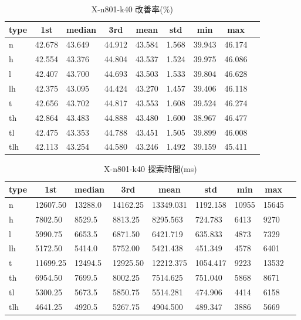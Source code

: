 \begin{table}[htbp]
    \centering
    \caption{X-n801-k40 改善率(\%)}
    \begin{tabular}{|l|l|l|l|l|l|l|l|l|}\hline
    \multicolumn{1}{|c|}{\textbf{type}}
    &\multicolumn{1}{|c|}{\textbf{1st}}
    &\multicolumn{1}{c|}{\textbf{median}}
    &\multicolumn{1}{c|}{\textbf{3rd}}
    &\multicolumn{1}{c|}{\textbf{mean}}
    &\multicolumn{1}{c|}{\textbf{std}}
    &\multicolumn{1}{c|}{\textbf{min}}
    &\multicolumn{1}{c|}{\textbf{max}}\\\hline
	n & 42.678 & 43.649 & 44.912 & 43.584 & 1.568 & 39.943 & 46.174\\\hline
	h & 42.554 & 43.376 & 44.804 & 43.537 & 1.524 & 39.975 & 46.086\\\hline
	l & 42.407 & 43.700 & 44.693 & 43.503 & 1.533 & 39.804 & 46.628\\\hline
	lh & 42.375 & 43.095 & 44.424 & 43.270 & 1.457 & 39.406 & 46.118\\\hline
	t & 42.656 & 43.702 & 44.817 & 43.553 & 1.608 & 39.524 & 46.274\\\hline
	th & 42.864 & 43.483 & 44.888 & 43.480 & 1.600 & 38.967 & 46.477\\\hline
	tl & 42.475 & 43.353 & 44.788 & 43.451 & 1.505 & 39.899 & 46.008\\\hline
	tlh & 42.113 & 43.254 & 44.580 & 43.246 & 1.492 & 39.159 & 45.411\\\hline
	\end{tabular}
\end{table}
\begin{table}[htbp]
    \centering
    \caption{X-n801-k40 探索時間(ms)}
    \begin{tabular}{|l|l|l|l|l|l|l|l|l|}\hline
    \multicolumn{1}{|c|}{\textbf{type}}
    &\multicolumn{1}{|c|}{\textbf{1st}}
    &\multicolumn{1}{c|}{\textbf{median}}
    &\multicolumn{1}{c|}{\textbf{3rd}}
    &\multicolumn{1}{c|}{\textbf{mean}}
    &\multicolumn{1}{c|}{\textbf{std}}
    &\multicolumn{1}{c|}{\textbf{min}}
    &\multicolumn{1}{c|}{\textbf{max}}\\\hline
	n & 12607.50 & 13288.0 & 14162.25 & 13349.031 & 1192.158 & 10955 & 15645\\\hline
	h & 7802.50 & 8529.5 & 8813.25 & 8295.563 & 724.783 & 6413 & 9270\\\hline
	l & 5990.75 & 6653.5 & 6871.50 & 6421.719 & 635.833 & 4873 & 7329\\\hline
	lh & 5172.50 & 5414.0 & 5752.00 & 5421.438 & 451.349 & 4578 & 6401\\\hline
	t & 11699.25 & 12494.5 & 12925.50 & 12212.375 & 1054.417 & 9223 & 13532\\\hline
	th & 6954.50 & 7699.5 & 8002.25 & 7514.625 & 751.040 & 5868 & 8671\\\hline
	tl & 5300.25 & 5673.5 & 5850.75 & 5514.281 & 474.906 & 4414 & 6158\\\hline
	tlh & 4641.25 & 4920.5 & 5267.75 & 4904.500 & 489.347 & 3886 & 5669\\\hline
	\end{tabular}
\end{table}
